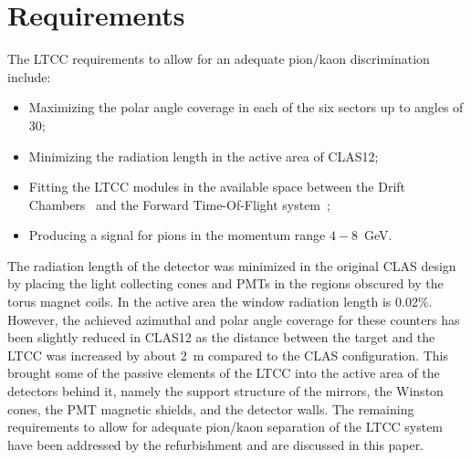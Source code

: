 \section{Requirements}

The LTCC requirements to allow for an adequate pion/kaon discrimination include:

\begin{itemize}
	\item Maximizing the polar angle coverage in each of the six sectors up to angles of 30\mdeg;
	\item Minimizing the radiation length in the active area of CLAS12;
	\item Fitting the LTCC modules in the available space between the Drift Chambers~\cite{dc-nim} and the Forward
          Time-Of-Flight system~\cite{ftof-nim};
	\item Producing a signal for pions in the momentum range $4-8$~GeV.
\end{itemize}

The radiation length of the detector was minimized in the original CLAS design by placing the light collecting cones
and PMTs in the regions obscured by the torus magnet coils. In the active area the window radiation length is 0.02\%.
However, the achieved azimuthal and polar angle coverage for these counters has been slightly reduced in CLAS12
as the distance between the target and the LTCC was increased by about 2~m compared to the CLAS configuration.
This brought some of the passive elements of the LTCC into the active area of the detectors behind it, namely the
support structure of the mirrors, the Winston cones, the PMT magnetic shields, and the detector walls. The remaining
requirements to allow for adequate pion/kaon separation of the LTCC system have been addressed by the refurbishment
and are discussed in this paper.


